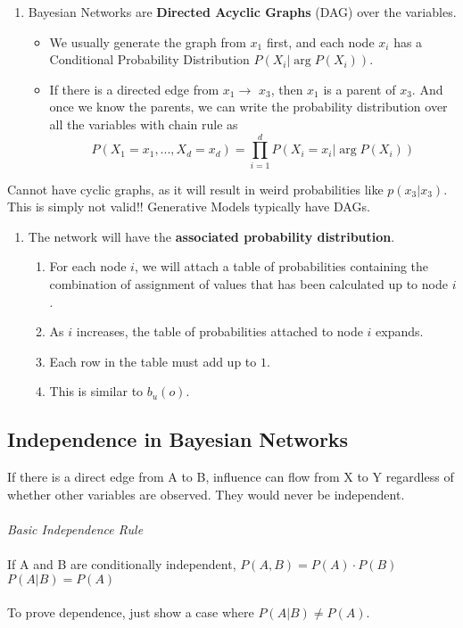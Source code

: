 \documentclass[a4paper]{article}
\begin{document}
\begin{enumerate}
	\item Bayesian Networks are \textbf{Directed Acyclic Graphs} (DAG) over the variables.
	\begin{itemize}[label=$\circ$]
		\item We usually generate the graph from $x_1$ first, and each node $x_i$ has a Conditional Probability Distribution $P(X_i | \arg P(X_i))$.
		\item If there is a directed edge from $x_1 \rightarrow$ $x_3$, then $x_1$ is a parent of $x_3$. And once we know the parents, we can write the probability distribution over all the variables with chain rule as
		$$ P(X_1=x_1,...,X_d = x_d) = \prod_{i=1}^d P(X_i = x_i|\arg P(X_i))$$
	\end{itemize}
\end{enumerate}
\begin{framed}
	\begin{displayquote}
		\begin{center}
			Cannot have cyclic graphs, as it will result in weird probabilities like $p(x_3|x_3)$. This is simply not valid!! Generative Models typically have DAGs.
		\end{center}
	\end{displayquote}
\end{framed}
\begin{enumerate}[label=\arabic*.,start=2]
	\item The network will have the \textbf{associated probability distribution}.
	\begin{enumerate}[label=\roman*.]
		\item For each node $i$, we will attach a table of probabilities containing the combination of assignment of values that has been calculated up to node $i$.
		\item As $i$ increases, the table of probabilities attached to node $i$ expands.
		\item Each row in the table must add up to $1$.
		\item This is similar to $b_u(o)$.
	\end{enumerate}
\end{enumerate}

\subsection{Independence in Bayesian Networks}
If there is a direct edge from A to B, influence can flow from X to Y regardless of whether other variables are observed. They would never be independent.\\
\\
\noindent \textit{Basic Independence Rule}\\
\\
\noindent If A and B are conditionally independent, $ P(A,B) = P(A)\cdot P(B) $ $P(A|B) = P(A) $\\
\\
\noindent To prove dependence, just show a case where $P(A|B) \not = P(A)$.
\end{document}
